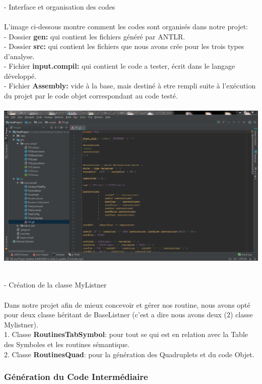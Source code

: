 \documentclass[12pt]{article}
\begin{document}
\texttt{ }\\
-	Interface et organisation des codes\\
\texttt{ }\\
L'image ci-dessous montre comment les codes sont organisés dans notre projet:\\
- Dossier \textbf{gen:} qui contient les fichiers généré par ANTLR.\\
- Dossier \textbf{src:} qui contient les fichiers que nous avons crée pour les trois types d'analyse.\\
- Fichier \textbf{input.compil:} qui contient le code a tester, écrit dans le langage développé.\\
- Fichier \textbf{Assembly:} vide à la base, mais destiné à etre rempli suite à l'exécution du projet par le code objet correspondant au code testé.\\
\texttt{ }\\
\includegraphics[width=1\textwidth]{IMG/Interface.png}


\texttt{ }\\
-	Création de la classe MyListner\\
\texttt{ }\\
Dans notre projet afin de mieux concevoir et gérer nos routine, nous avons opté pour deux classe héritant de BaseListner (c'est a dire nous avons deux (2) classe Mylistner).\\
1. Classe \textbf{RoutinesTabSymbol}: pour tout se qui est en relation avec la Table des Symboles et les routines sémantique.\\
2. Classe \textbf{RoutinesQuad}: pour la génération des Quadruplets et du code Objet.\\ 

\subsubsection{Génération du Code Intermédiaire}
\end{document}
